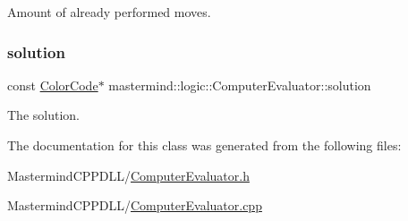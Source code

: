 Amount of already performed moves. 

\hypertarget{classmastermind_1_1logic_1_1_computer_evaluator_a8bd8017a92e245a8985f2caf71b45c44}{}\label{classmastermind_1_1logic_1_1_computer_evaluator_a8bd8017a92e245a8985f2caf71b45c44} 
\subsubsection{\texorpdfstring{solution}{solution}}
{\footnotesize\ttfamily const \hyperlink{classmastermind_1_1logic_1_1_color_code}{Color\+Code}$\ast$ mastermind\+::logic\+::\+Computer\+Evaluator\+::solution\hspace{0.3cm}{\ttfamily [private]}}



The solution. 



The documentation for this class was generated from the following files\+:\begin{DoxyCompactItemize}
\item 
Mastermind\+C\+P\+P\+D\+L\+L/\hyperlink{_computer_evaluator_8h}{Computer\+Evaluator.\+h}\item 
Mastermind\+C\+P\+P\+D\+L\+L/\hyperlink{_computer_evaluator_8cpp}{Computer\+Evaluator.\+cpp}\end{DoxyCompactItemize}
